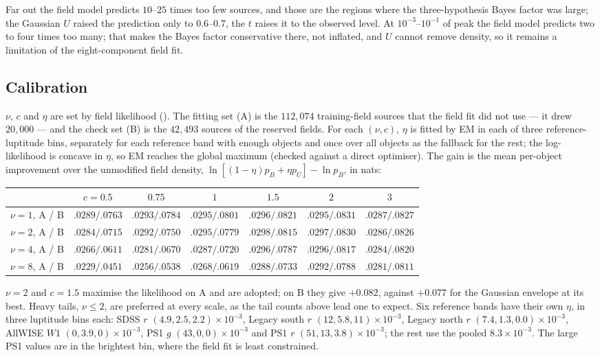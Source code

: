 \documentclass[11pt,a4paper]{article}
\begin{document}
\noindent
Far out the field model predicts $10$--$25$ times too few sources, and those are
the regions where the three-hypothesis Bayes factor was large; the Gaussian $U$
raised the prediction only to $0.6$--$0.7$, the $t$ raises it to the observed
level. At $10^{-3}$--$10^{-1}$ of peak the field model predicts two to four times
too many; that makes the Bayes factor conservative there, not inflated, and $U$
cannot remove density, so it remains a limitation of the eight-component field
fit.

\subsection{Calibration}

$\nu$, $c$ and $\eta$ are set by field likelihood
(). The fitting set (A) is the
$112{,}074$ training-field sources that the field fit did not use --- it drew
$20{,}000$ --- and the check set (B) is the $42{,}493$ sources of the reserved
fields. For each $(\nu, c)$, $\eta$ is fitted by EM in each of three
reference-luptitude bins, separately for each reference band with enough objects
and once over all objects as the fallback for the rest; the log-likelihood is
concave in $\eta$, so EM reaches the global maximum (checked against a direct
optimiser). The gain is the mean per-object improvement over the unmodified
field density, $\ln[(1-\eta)p_B+\eta p_U]-\ln p_B$, in nats:

\begin{center}
\small
\begin{tabular}{lcccccc}
\toprule
 & $c=0.5$ & $0.75$ & $1$ & $1.5$ & $2$ & $3$ \\
\midrule
$\nu=1$, A / B & $.0289/.0763$ & $.0293/.0784$ & $.0295/.0801$ & $.0296/.0821$ & $.0295/.0831$ & $.0287/.0827$ \\
$\nu=2$, A / B & $.0284/.0715$ & $.0292/.0750$ & $.0295/.0779$ & $\mathbf{.0298/.0815}$ & $.0297/.0830$ & $.0286/.0826$ \\
$\nu=4$, A / B & $.0266/.0611$ & $.0281/.0670$ & $.0287/.0720$ & $.0296/.0787$ & $.0296/.0817$ & $.0284/.0820$ \\
$\nu=8$, A / B & $.0229/.0451$ & $.0256/.0538$ & $.0268/.0619$ & $.0288/.0733$ & $.0292/.0788$ & $.0281/.0811$ \\
\bottomrule
\end{tabular}
\end{center}

\noindent
$\nu=2$ and $c=1.5$ maximise the likelihood on A and are adopted; on B they give
$+0.082$, against $+0.077$ for the Gaussian envelope at its best. Heavy tails,
$\nu\le2$, are preferred at every scale, as the tail counts above lead one to
expect. Six reference
bands have their own $\eta$, in three luptitude bins each: SDSS $r$
$(4.9,2.5,2.2)\times10^{-3}$, Legacy south $r$ $(12,5.8,11)\times10^{-3}$, Legacy
north $r$ $(7.4,1.3,0.0)\times10^{-3}$, AllWISE $W1$ $(0,3.9,0)\times10^{-3}$, PS1
$g$ $(43,0,0)\times10^{-3}$ and PS1 $r$ $(51,13,3.8)\times10^{-3}$; the rest use the
pooled $8.3\times10^{-3}$. The large PS1 values are in the brightest bin, where
the field fit is least constrained.
\end{document}
